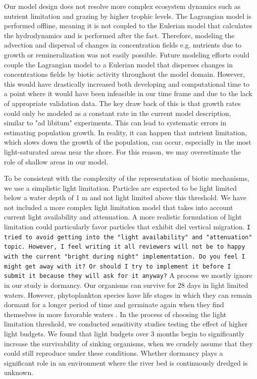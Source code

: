 \documentclass[npg, manuscript]{copernicus}
\begin{document}
Our model design does not resolve more complex ecosystem dynamics such as nutrient limitation and grazing by higher trophic levels. 
The Lagrangian model is performed offline, meaning it is not coupled to the Eulerian model that calculates the hydrodynamics and is performed after the fact.
Therefore, modeling the advection and dispersal of changes in concentration fields e.g. nutrients due to growth or remineralization was not easily possible.
Future modeling efforts could couple the Lagrangian model to a Eulerian model that disperses changes in concentrations fields by biotic activity throughout the model domain.
However, this would have drastically increased both developing and computational time to a point where it would have been infeasible in our time frame and due to the lack of appropriate validation data.
The key draw back of this is that growth rates could only be modeled as a constant rate in the current model description, similar to "ad libitum" experiments. 
This can lead to systematic errors in estimating population growth.
In reality, it can happen that nutrient limitation, which slows down the growth of the population, can occur, especially in the most light-saturated areas near the shore. For this reason, we may overestimate the role of shallow areas in our model.


To be consistent with the complexity of the representation of biotic mechanisms, we use a simplistic light limitation.
Particles are expected to be light limited below a water depth of 1 \unit{m} and not light limited above this threshold. 
We have not included a more complex light limitation model that takes into account current light availability and attenuation.
A more realistic formulation of light limitation could particularly favor particles that exhibit diel vertical migration.
\texttt{I tried to avoid getting into the "light availability" and "attenuation" topic. However, I feel writing it all reviewers will not be to happy with the current "bright during night" implementation. Do you feel I might get away with it? Or should I try to implement it before I submit it because they will ask for it anyway?}
A process we mostly ignore in our study is dormancy.
Our organisms can survive for $28$ days in light limited waters.
However, phytoplankton species have life stages in which they can remain dormant for a longer period of time and germinate again when they find themselves in more favorable waters \citep{ThomasAnderson1998}.
In the process of choosing the light limitation threshold, we conducted sensitivity studies testing the effect of higher light budgets.
We found that light budgets over 3 months begin to significantly increase the survivability of sinking organisms, when we crudely assume that they could still reproduce under these conditions.
Whether dormancy plays a significant role in an environment where the river bed is continuously dredged is unknown.
\end{document}
